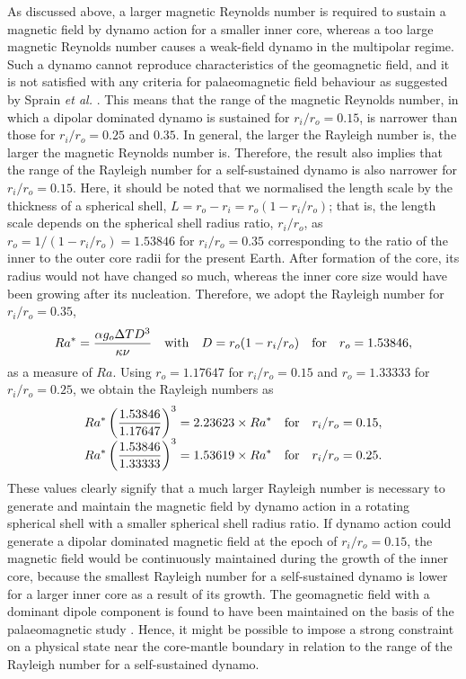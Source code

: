 {\color{red}
As discussed above, a larger magnetic Reynolds number is required to sustain a magnetic field by dynamo action for a smaller inner core, whereas a too large magnetic Reynolds number causes a weak-field dynamo in the multipolar regime.
Such a dynamo cannot reproduce characteristics of the geomagnetic field, and it is not satisfied with any criteria for palaeomagnetic field behaviour as suggested by Sprain {\it et al.} .
This means that the range of the magnetic Reynolds number, in which a dipolar dominated dynamo is sustained for $r_i / r_o = 0.15$, is narrower than those for $r_i / r_o = 0.25$ and $0.35$.
In general, the larger the Rayleigh number is, the larger the magnetic Reynolds number is.
Therefore, the result also implies that the range of the Rayleigh number for a self-sustained dynamo is also narrower for $r_i / r_o = 0.15$.
Here, it should be noted that we normalised the length scale by the thickness of a spherical shell, $L = r_o - r_i = r_o (1 - r_i / r_o)$; that is, the length scale depends on the spherical shell radius ratio, $r_i / r_o$, as $r_o = 1 / (1 - r_i / r_o) = 1.53846$ for $r_i / r_o = 0.35$ corresponding to the ratio of the inner to the outer core radii for the present Earth.
After formation of the core, its radius would not have changed so much, whereas the inner core size would have been growing after its nucleation.
Therefore, we adopt the Rayleigh number for $r_i / r_o = 0.35$,
%
\begin{equation}
    Ra^* = \frac{\alpha g_o \Delta T D^3}{\kappa\nu}
    ~~~{\rm with}~~~D = r_o (1 - r_i / r_o)
    ~~~{\rm for}~~~r_o = 1.53846,
\label{eq:Ra_0.35}
\end{equation}
%
as a measure of $Ra$.
Using $r_o = 1.17647$ for $r_i / r_o = 0.15$ and $r_o = 1.33333$ for $r_i / r_o = 0.25$, we obtain the Rayleigh numbers as
%
\begin{equation}
\begin{array}{l}
    \displaystyle
    Ra^* \left( \frac{1.53846}{1.17647} \right)^3
    = 2.23623 \times Ra^* 
    ~~~{\rm for} ~~~ r_i / r_o = 0.15,\\
    \displaystyle
    Ra^* \left( \frac{1.53846}{1.33333} \right)^3
    = 1.53619 \times Ra^* 
    ~~~{\rm for} ~~~ r_i / r_o = 0.25.
\end{array}
\end{equation}
%
These values clearly signify that a much larger Rayleigh number is necessary to generate and maintain the magnetic field by dynamo action in a rotating spherical shell with a smaller spherical shell radius ratio.
If dynamo action could generate a dipolar dominated magnetic field at the epoch of $r_i / r_o = 0.15$, the magnetic field would be continuously maintained during the growth of the inner core, because the smallest Rayleigh number for a self-sustained dynamo is lower for a larger inner core as a result of its growth.
The geomagnetic field with a dominant dipole component is found to have been maintained on the basis of the palaeomagnetic study \cite{Merrill:1996}.
Hence, it might be possible to impose a strong constraint on a physical state near the core-mantle boundary in relation to the range of the Rayleigh number for a self-sustained dynamo.
}

